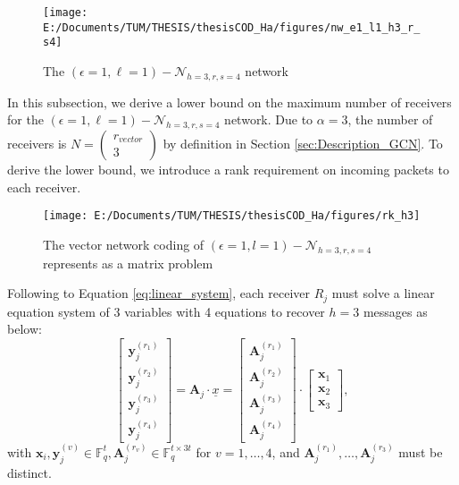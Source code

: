 \begin{figure}[H]
\caption{The $(\epsilon=1,\ell=1)-\mathcal{N}_{h=3,r,s=4}$ network\label{fig:nw_e1_l1_h3_r_s4}}

\centering{}\texttt{[image: E:/Documents/TUM/THESIS/thesisCOD\_Ha/figures/nw\_e1\_l1\_h3\_r\_s4]}
\end{figure}
In this subsection, we derive a lower bound on the maximum number
of receivers for the $\left(\epsilon=1,\ell=1\right)-\mathcal{N}_{h=3,r,s=4}$
network. Due to $\alpha=3$, the number of receivers is $N=\left(\begin{array}{c}
r_{vector}\\
3
\end{array}\right)$ by definition in Section \ref{sec:Description_GCN}. To derive the
lower bound, we introduce a rank requirement on incoming packets to
each receiver. 
\begin{figure}[H]
\caption{The vector network coding of $(\epsilon=1,l=1)-\mathcal{N}_{h=3,r,s=4}$
represents as a matrix problem\label{fig:rk_h3}}

\centering{}\texttt{[image: E:/Documents/TUM/THESIS/thesisCOD\_Ha/figures/rk\_h3]}
\end{figure}
Following to Equation \ref{eq:linear_system}, each receiver $R_{j}$
must solve a linear equation system of 3 variables with 4 equations
to recover $h=3$ messages as below:
\[
\left[\begin{array}{c}
\boldsymbol{y}_{j}^{\left(r_{1}\right)}\\
\boldsymbol{y}_{j}^{\left(r_{2}\right)}\\
\boldsymbol{y}_{j}^{\left(r_{3}\right)}\\
\boldsymbol{y}_{j}^{\left(r_{4}\right)}
\end{array}\right]=\boldsymbol{A}_{j}\cdot\underline{x}=\left[\begin{array}{c}
\boldsymbol{A}_{j}^{\left(r_{1}\right)}\\
\boldsymbol{A}_{j}^{\left(r_{2}\right)}\\
\boldsymbol{A}_{j}^{\left(r_{3}\right)}\\
\boldsymbol{A}_{j}^{\left(r_{4}\right)}
\end{array}\right]\cdot\left[\begin{array}{c}
\boldsymbol{x}_{1}\\
\boldsymbol{x}_{2}\\
\boldsymbol{x}_{3}
\end{array}\right],
\]
with $\boldsymbol{x}_{i},\boldsymbol{y}_{j}^{\left(v\right)}\in\ensuremath{\mathbb{F}}_{q}^{t},\boldsymbol{A}_{j}^{\left(r_{v}\right)}\in\ensuremath{\mathbb{F}}_{q}^{t\times3t}$
for $v=1,\ldots,4$, and $\boldsymbol{A}_{j}^{\left(r_{1}\right)},\ldots,\boldsymbol{A}_{j}^{\left(r_{3}\right)}$
must be distinct.

